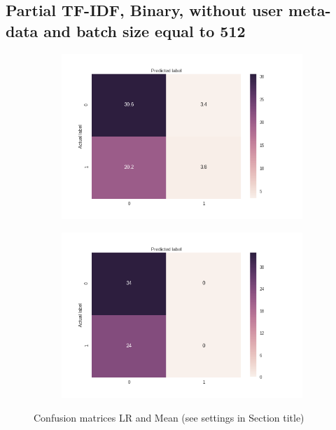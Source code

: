 \documentclass[sigconf]{acmart-txmm}
\begin{document}

\subsection{Partial TF-IDF, Binary, without user meta-data and batch size equal to 512}

\begin{figure}[H]
\centering
\begin{subfigure}
  \centering
  \includegraphics[width=1\linewidth]{report/img/conf_matrices/keywords_tfidf_p_binary_0_0_512_LR.png}
  \label{fig:keywords_tfidf_p_binary_0_0_512_LR}
\end{subfigure}%
\begin{subfigure}
  \centering
  \includegraphics[width=1\linewidth]{report/img/conf_matrices/keywords_tfidf_p_binary_0_0_512_mean.png}
  \label{fig:keywords_tfidf_p_binary_0_0_512_mean}
\end{subfigure}
\caption{Confusion matrices LR and Mean (see settings in Section title)}
\label{fig:keywords_tfidf_p_binary_0_0_512}
\end{figure}
\end{document}
